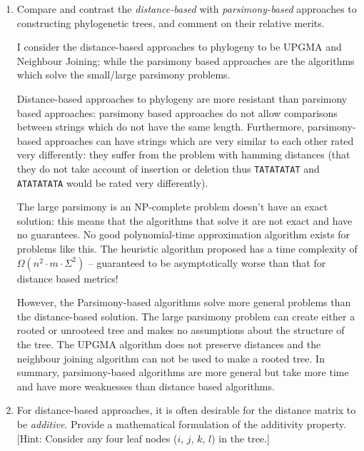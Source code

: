 \documentclass[10pt,\jkfside,a4paper]{article}
\begin{document}
\begin{enumerate}

    \item Compare and contrast the \textit{distance-based} with \textit{parsimony-based} approaches to constructing phylogenetic trees, and comment on their relative merits.

    I consider the distance-based approaches to phylogeny to be UPGMA and Neighbour Joining; while the parsimony based approaches are the algorithms which solve the small/large parsimony problems.

    Distance-based approaches to phylogeny are more resistant than parsimony based approaches: parsimony based approaches do not allow comparisons between strings which do not have the same length. Furthermore,
    parsimony-based approaches can have strings which are very similar to each other rated very differently: they suffer from the problem with hamming distances (\ie that they do not take account of insertion or
    deletion thus \texttt{TATATATAT} and \texttt{ATATATATA} would be rated very differently).

    The large parsimony is an NP-complete problem doesn't have an exact solution: this means that the algorithms that solve it are not exact and have no guarantees. No good polynomial-time approximation
    algorithm exists for problems like this. The heuristic algorithm proposed has a time complexity of $\Omega(n^2 \cdot m \cdot \Sigma^2)$ -- guaranteed to be asymptotically worse than that for distance based
    metrics!

    However, the Parsimony-based algorithms solve more general problems than the distance-based solution. The large parsimony problem can create either a rooted or unrooteed tree and makes no assumptions about
    the structure of the tree. The UPGMA algorithm does not preserve distances and the neighbour joining algorithm can not be used to make a rooted tree. In summary, parsimony-based algorithms are more general
    but take more time and have more weaknesses than distance based algorithms.

    \item For distance-based approaches, it is often desirable for the distance matrix to be \textit{additive}. Provide a mathematical formulation of the additivity property. [Hint: Consider any four leaf nodes
    ($i$, $j$, $k$, $l$) in the tree.]

    \begin{definition}


\end{definition}
\end{enumerate}
\end{document}

